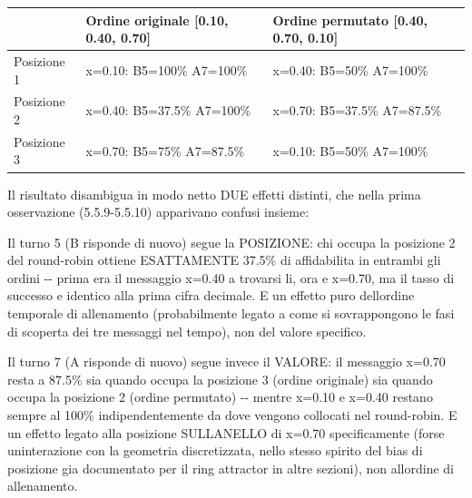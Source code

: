 \documentclass[
  italian,
]{article}
\newcounter{none} %
\begin{document}
{\def\LTcaptype{none} %
\begin{longtable}[]{@{}
  >{\raggedright\arraybackslash}p{}
  >{\raggedright\arraybackslash}p{}
  >{\raggedright\arraybackslash}p{}@{}}
\toprule\noalign{}
\begin{minipage}[b]{\linewidth}\raggedright
\end{minipage} & \begin{minipage}[b]{\linewidth}\raggedright
Ordine originale {[}0.10, 0.40, 0.70{]}
\end{minipage} & \begin{minipage}[b]{\linewidth}\raggedright
Ordine permutato {[}0.40, 0.70, 0.10{]}
\end{minipage} \\
\midrule\noalign{}
\endhead
\bottomrule\noalign{}
\endlastfoot
Posizione 1 & x=0.10: B5=100\% A7=100\% & x=0.40: B5=50\% A7=100\% \\
Posizione 2 & x=0.40: B5=37.5\% A7=100\% & x=0.70: B5=37.5\% A7=87.5\% \\
Posizione 3 & x=0.70: B5=75\% A7=87.5\% & x=0.10: B5=50\% A7=100\% \\
\end{longtable}
}

Il risultato disambigua in modo netto DUE effetti distinti, che nella prima osservazione (5.5.9-5.5.10) apparivano confusi insieme:

Il turno 5 (B risponde di nuovo) segue la POSIZIONE: chi occupa la posizione 2 del round-robin ottiene ESATTAMENTE 37.5\% di affidabilita\textquotesingle{} in entrambi gli ordini -\/- prima era il messaggio x=0.40 a trovarsi li\textquotesingle, ora e\textquotesingle{} x=0.70, ma il tasso di successo e\textquotesingle{} identico alla prima cifra decimale. E\textquotesingle{} un effetto puro dell\textquotesingle ordine temporale di allenamento (probabilmente legato a come si sovrappongono le fasi di scoperta dei tre messaggi nel tempo), non del valore specifico.

Il turno 7 (A risponde di nuovo) segue invece il VALORE: il messaggio x=0.70 resta a 87.5\% sia quando occupa la posizione 3 (ordine originale) sia quando occupa la posizione 2 (ordine permutato) -\/- mentre x=0.10 e x=0.40 restano sempre al 100\% indipendentemente da dove vengono collocati nel round-robin. E\textquotesingle{} un effetto legato alla posizione SULL\textquotesingle ANELLO di x=0.70 specificamente (forse un\textquotesingle interazione con la geometria discretizzata, nello stesso spirito del bias di posizione gia\textquotesingle{} documentato per il ring attractor in altre sezioni), non all\textquotesingle ordine di allenamento.
\end{document}
